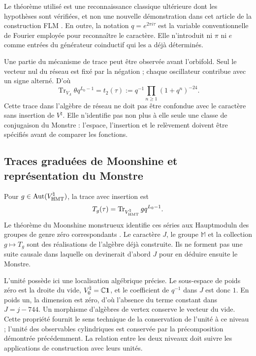 Le théorème utilisé est une reconnaissance classique ultérieure dont les hypothèses sont vérifiées, et non une nouvelle démonstration dans cet article de la construction FLM \cite{flm}. En outre, la notation $q=e^{2\pi i\tau}$ est la variable conventionnelle de Fourier employée pour reconnaître le caractère. Elle n'introduit ni $\pi$ ni $e$ comme entrées du générateur coinductif qui les a déjà déterminés.

Une partie du mécanisme de trace peut être observée avant l'orbifold.
Seul le vecteur nul du réseau est fixé par la négation ; chaque
oscillateur contribue avec un signe alterné. D'où
\[
 \operatorname{Tr}_{V_\Lambda}\theta q^{L_0-1}
   =t_2(\tau)
   :=q^{-1}\prod_{n\geq1}(1+q^n)^{-24}.
\]
Cette trace dans l'algèbre de réseau ne doit pas être confondue avec le
caractère sans insertion de $V^\natural$. Elle n'identifie pas non plus à elle
seule une classe de conjugaison du Monstre : l'espace, l'insertion
et le relèvement doivent être spécifiés avant de comparer les fonctions.



\subsection{Traces graduées de Moonshine et représentation du Monstre}
\label{exc:alcance}

Pour $g\in\operatorname{Aut}(V^\natural_{\rm HMT})$, la trace avec insertion est
\[
 T_g(\tau)=
 \operatorname{Tr}_{V^\natural_{\rm HMT}}gq^{L_0-1}.
\]
Le théorème du Moonshine monstrueux identifie ces séries aux
Hauptmoduln des groupes de genre zéro correspondants
\cite[théorème~1.1]{borcherds}.
Le caractère $J$, le groupe $\mathbb M$ et la collection $g\mapsto T_g$
sont des réalisations de l'algèbre déjà construite. Ils ne forment pas une suite
causale dans laquelle on devinerait d'abord $J$ pour en déduire ensuite le Monstre.

L'unité possède ici une localisation algébrique précise. Le sous-espace de poids zéro est la droite du vide, \(V^\natural_0=\mathbb C\mathbf1\), et le coefficient de \(q^{-1}\) dans \(J\) est donc \(1\). En poids un, la dimension est zéro, d'où l'absence du terme constant dans \(J=j-744\). Un morphisme d'algèbres de vertex conserve le vecteur du vide. Cette propriété fournit le sens technique de la conservation de l'unité à ce niveau ; l'unité des observables cylindriques est conservée par la précomposition démontrée précédemment. La relation entre les deux niveaux doit suivre les applications de construction avec leurs unités.

